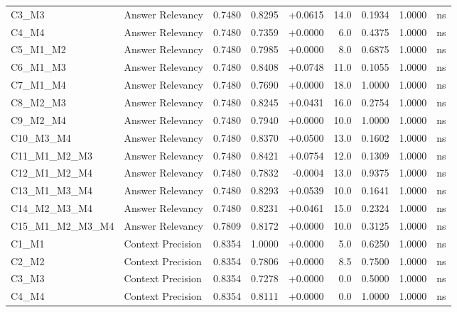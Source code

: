 \begin{table}[p]
\begin{tabular*}{\textwidth}{@{\extracolsep{\fill}} l l r r r r r r c @{}}
\addlinespace
C3\_M3          & Answer Relevancy     & 0.7480 & 0.8295 & +0.0615 & 14.0 & 0.1934 & 1.0000 & ns \\
\addlinespace
C4\_M4          & Answer Relevancy     & 0.7480 & 0.7359 & +0.0000 & 6.0 & 0.4375 & 1.0000 & ns \\
\addlinespace
C5\_M1\_M2      & Answer Relevancy     & 0.7480 & 0.7985 & +0.0000 & 8.0 & 0.6875 & 1.0000 & ns \\
\addlinespace
C6\_M1\_M3      & Answer Relevancy     & 0.7480 & 0.8408 & +0.0748 & 11.0 & 0.1055 & 1.0000 & ns \\
\addlinespace
C7\_M1\_M4      & Answer Relevancy     & 0.7480 & 0.7690 & +0.0000 & 18.0 & 1.0000 & 1.0000 & ns \\
\addlinespace
C8\_M2\_M3      & Answer Relevancy     & 0.7480 & 0.8245 & +0.0431 & 16.0 & 0.2754 & 1.0000 & ns \\
\addlinespace
C9\_M2\_M4      & Answer Relevancy     & 0.7480 & 0.7940 & +0.0000 & 10.0 & 1.0000 & 1.0000 & ns \\
\addlinespace
C10\_M3\_M4     & Answer Relevancy     & 0.7480 & 0.8370 & +0.0500 & 13.0 & 0.1602 & 1.0000 & ns \\
\addlinespace
C11\_M1\_M2\_M3 & Answer Relevancy     & 0.7480 & 0.8421 & +0.0754 & 12.0 & 0.1309 & 1.0000 & ns \\
\addlinespace
C12\_M1\_M2\_M4 & Answer Relevancy     & 0.7480 & 0.7832 & -0.0004 & 13.0 & 0.9375 & 1.0000 & ns \\
\addlinespace
C13\_M1\_M3\_M4 & Answer Relevancy     & 0.7480 & 0.8293 & +0.0539 & 10.0 & 0.1641 & 1.0000 & ns \\
\addlinespace
C14\_M2\_M3\_M4 & Answer Relevancy     & 0.7480 & 0.8231 & +0.0461 & 15.0 & 0.2324 & 1.0000 & ns \\
\addlinespace
C15\_M1\_M2\_M3\_M4 & Answer Relevancy     & 0.7809 & 0.8172 & +0.0000 & 10.0 & 0.3125 & 1.0000 & ns \\
\addlinespace
C1\_M1          & Context Precision    & 0.8354 & 1.0000 & +0.0000 & 5.0 & 0.6250 & 1.0000 & ns \\
\addlinespace
C2\_M2          & Context Precision    & 0.8354 & 0.7806 & +0.0000 & 8.5 & 0.7500 & 1.0000 & ns \\
\addlinespace
C3\_M3          & Context Precision    & 0.8354 & 0.7278 & +0.0000 & 0.0 & 0.5000 & 1.0000 & ns \\
\addlinespace
C4\_M4          & Context Precision    & 0.8354 & 0.8111 & +0.0000 & 0.0 & 1.0000 & 1.0000 & ns \\

\end{tabular*}
\end{table}
